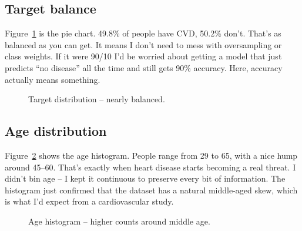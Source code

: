 \documentclass[12pt, a4paper, oneside]{book}
\begin{document}
\subsection{Target balance}
Figure~\ref{fig:target_pie} is the pie chart. 49.8\% of people have CVD, 50.2\% don't. That's as balanced as you can get. It means I don't need to mess with oversampling or class weights. If it were 90/10 I'd be worried about getting a model that just predicts ``no disease'' all the time and still gets 90\% accuracy. Here, accuracy actually means something.

\begin{figure}[htbp]
\centering
{}
\caption{Target distribution -- nearly balanced.}
\label{fig:target_pie}
\end{figure}

\subsection{Age distribution}
Figure~\ref{fig:age_hist} shows the age histogram. People range from 29 to 65, with a nice hump around 45--60. That's exactly when heart disease starts becoming a real threat. I didn't bin age -- I kept it continuous to preserve every bit of information. The histogram just confirmed that the dataset has a natural middle-aged skew, which is what I'd expect from a cardiovascular study.

\begin{figure}[htbp]
\centering
{}
\caption{Age histogram -- higher counts around middle age.}
\label{fig:age_hist}
\end{figure}
\end{document}
